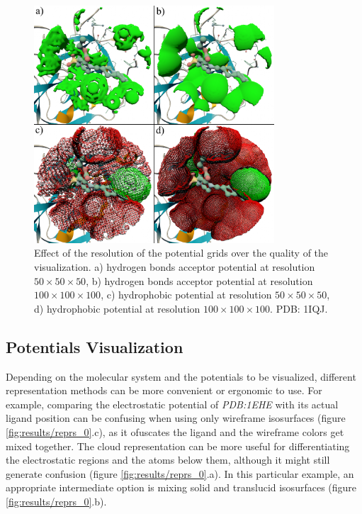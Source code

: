     \begin{figure}[H]
      \centering
      \includegraphics[width=0.8\textwidth]{figures/results/resolution.png}
      \caption{\label{fig:results/resolution} Effect of the resolution of the potential grids over the quality of the visualization. a) hydrogen bonds acceptor potential at resolution $50 \times 50 \times 50$, b) hydrogen bonds acceptor potential at resolution $100 \times 100 \times 100$, c) hydrophobic potential at resolution $50 \times 50 \times 50$, d) hydrophobic potential at resolution $100 \times 100 \times 100$. PDB: 1IQJ.}
    \end{figure}

  \subsection{Potentials Visualization}
    Depending on the molecular system and the potentials to be visualized, different representation methods can be more convenient or ergonomic to use. For example, comparing the electrostatic potential of \textit{PDB:1EHE} with its actual ligand position can be confusing when using only wireframe isosurfaces (figure \ref{fig:results/reprs_0}.c), as it ofuscates the ligand and the wireframe colors get mixed together. The cloud representation can be more useful for differentiating the electrostatic regions and the atoms below them, although it might still generate confusion (figure \ref{fig:results/reprs_0}.a). In this particular example, an appropriate intermediate option is mixing solid and translucid isosurfaces (figure \ref{fig:results/reprs_0}.b).

